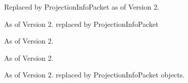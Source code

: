 
\begin{DoxyRefList}
\item[\label{deprecated__deprecated000001}%
\hypertarget{deprecated__deprecated000001}{}%
Class \hyperlink{classrepast_1_1_cell_contents}{repast\-:\-:Cell\-Contents$<$ Agent\-Content, G\-P\-Type $>$} ]Replaced by Projection\-Info\-Packet as of Version 2.  
\item[\label{deprecated__deprecated000005}%
\hypertarget{deprecated__deprecated000005}{}%
Class \hyperlink{classrepast_1_1_edge_exporter}{repast\-:\-:Edge\-Exporter$<$ E $>$} ]As of Version 2. replaced by Projection\-Info\-Packet  
\item[\label{deprecated__deprecated000003}%
\hypertarget{deprecated__deprecated000003}{}%
Class \hyperlink{classrepast_1_1_export_request}{repast\-:\-:Export\-Request} ]As of Version 2.  
\item[\label{deprecated__deprecated000002}%
\hypertarget{deprecated__deprecated000002}{}%
Class \hyperlink{classrepast_1_1_grid_buffer_syncher}{repast\-:\-:Grid\-Buffer\-Syncher$<$ T, G\-P\-Type $>$} ]As of Version 2.  
\item[\label{deprecated__deprecated000004}%
\hypertarget{deprecated__deprecated000004}{}%
Class \hyperlink{classrepast_1_1_item_receipt}{repast\-:\-:Item\-Receipt$<$ E $>$} ]As of Version 2. replaced by Projection\-Info\-Packet objects. 
\end{DoxyRefList}